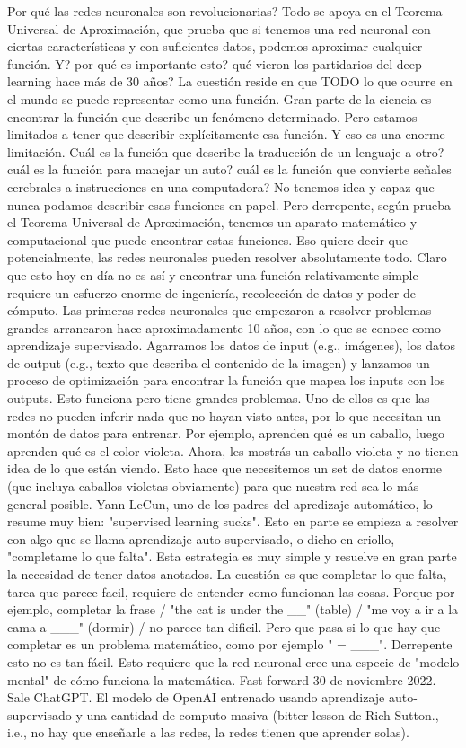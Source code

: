 Por qué las redes neuronales son revolucionarias?
Todo se apoya en el Teorema Universal de Aproximación, que prueba que si 
tenemos una red neuronal con ciertas características y con suficientes datos, 
podemos aproximar cualquier función. Y? por qué es importante esto? qué vieron los partidarios del 
deep learning hace más de 30 años? La cuestión reside en que TODO lo que ocurre en el mundo
se puede representar como una función. Gran parte de la ciencia es encontrar la función que describe un
fenómeno determinado. Pero estamos limitados a tener que describir explícitamente esa función. 
Y eso es una enorme limitación. Cuál es la función que describe la traducción de un lenguaje a otro?
cuál es la función para manejar un auto? cuál es la función que convierte señales cerebrales a instrucciones
en una computadora? No tenemos idea y capaz que nunca podamos describir esas funciones en papel. 
Pero derrepente, según prueba el Teorema Universal de Aproximación, tenemos un aparato matemático y
computacional que puede encontrar estas funciones. Eso quiere decir que potencialmente, las redes 
neuronales pueden resolver absolutamente todo. Claro que esto hoy en día no es así y encontrar una 
función relativamente simple requiere un esfuerzo enorme de ingeniería, recolección de datos y poder 
de cómputo. Las primeras redes neuronales que empezaron a resolver problemas grandes arrancaron hace
aproximadamente 10 años, con lo que se conoce como aprendizaje supervisado. Agarramos los datos de
input (e.g., imágenes), los datos de output (e.g., texto que describa el contenido de la imagen) y 
lanzamos un proceso de optimización para encontrar la función que mapea los inputs con los outputs. 
Esto funciona pero tiene grandes problemas. Uno de ellos es que las redes no pueden inferir nada que no hayan visto antes, por lo que necesitan un montón de datos para entrenar. 
Por ejemplo, aprenden qué es un caballo, luego aprenden qué es el color violeta. Ahora, les mostrás un caballo violeta y no tienen
idea de lo que están viendo. Esto hace que necesitemos un set de datos enorme (que incluya caballos violetas obviamente) para que nuestra red
sea lo más general posible. 
Yann LeCun, uno de los padres del apredizaje automático, lo resume muy bien: "supervised learning sucks".
Esto en parte se empieza a resolver con algo que se llama aprendizaje auto-supervisado, o dicho en criollo, 
"completame lo que falta". Esta estrategia es muy simple y resuelve en gran parte la necesidad de tener datos
anotados. La cuestión es que completar lo que falta, tarea que parece facil, requiere de entender como funcionan las cosas. 
Porque por ejemplo, completar la frase / "the cat is under the __" (table) / "me voy a ir a la cama a ___" (dormir) / no parece tan dificil. 
Pero que pasa si lo que hay que completar es un problema matemático, como por ejemplo " = ___". Derrepente esto 
no es tan fácil. Esto requiere que la red neuronal cree una especie de "modelo mental" de cómo funciona la matemática. 
Fast forward 30 de noviembre 2022. Sale ChatGPT. El modelo de OpenAI entrenado usando aprendizaje auto-supervisado y una cantidad de 
computo masiva (bitter lesson de Rich Sutton., i.e., no hay que enseñarle a las redes, la redes tienen que aprender solas). 


